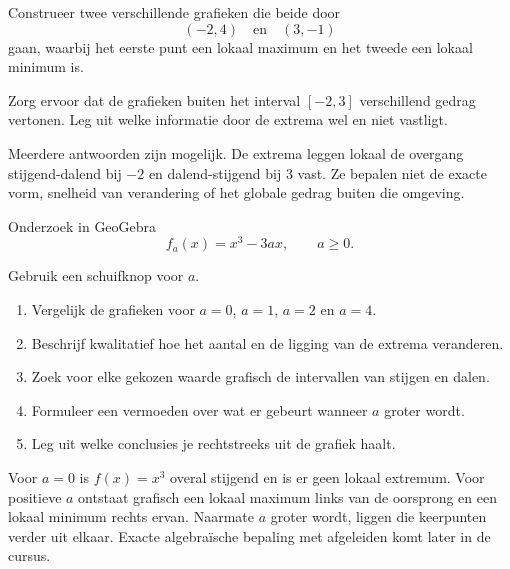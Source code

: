 \documentclass{ximera}
\begin{document}
\begin{oefening}{\oefG}

Construeer twee verschillende grafieken die beide door
\[
(-2,4)\quad\text{en}\quad(3,-1)
\]
gaan, waarbij het eerste punt een lokaal maximum en het tweede een lokaal minimum is.

Zorg ervoor dat de grafieken buiten het interval \([-2,3]\) verschillend gedrag vertonen.
Leg uit welke informatie door de extrema wel en niet vastligt.

\begin{oplossing}
Meerdere antwoorden zijn mogelijk. De extrema leggen lokaal de overgang
stijgend-dalend bij \(-2\) en dalend-stijgend bij \(3\) vast.
Ze bepalen niet de exacte vorm, snelheid van verandering of het globale gedrag
buiten die omgeving.
\end{oplossing}
\end{oefening}

\begin{oefening}{\oefG}
  
Onderzoek in GeoGebra
\[
f_a(x)=x^3-3ax,\qquad a\geq 0.
\]

Gebruik een schuifknop voor \(a\).

\begin{enumerate}
  \item Vergelijk de grafieken voor \(a=0\), \(a=1\), \(a=2\) en \(a=4\).
  \item Beschrijf kwalitatief hoe het aantal en de ligging van de extrema veranderen.
  \item Zoek voor elke gekozen waarde grafisch de intervallen van stijgen en dalen.
  \item Formuleer een vermoeden over wat er gebeurt wanneer \(a\) groter wordt.
  \item Leg uit welke conclusies je rechtstreeks uit de grafiek haalt.
\end{enumerate}

\begin{oplossing}
Voor \(a=0\) is \(f(x)=x^3\) overal stijgend en is er geen lokaal extremum.
Voor positieve \(a\) ontstaat grafisch een lokaal maximum links van de oorsprong
en een lokaal minimum rechts ervan. Naarmate \(a\) groter wordt, liggen die
keerpunten verder uit elkaar. Exacte algebraïsche bepaling met afgeleiden
komt later in de cursus.
\end{oplossing}
\end{oefening}
\end{document}
